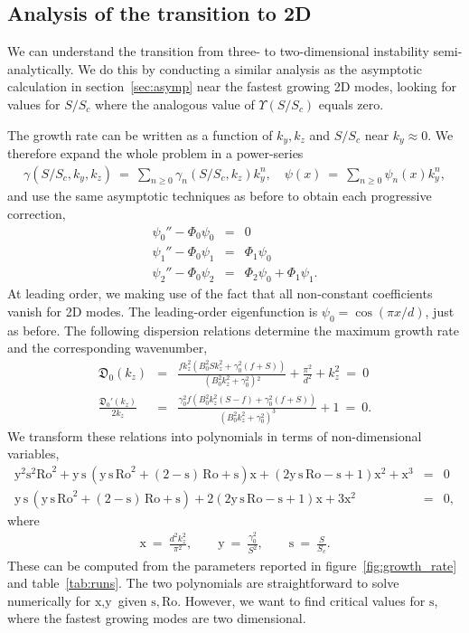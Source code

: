 \documentclass[openacc]{rsproca_new}%
\newcommand{\SSC}{S/S_{c}}
\newcommand\Beq{\begin{eqnarray}}
\newcommand\Eeq{\end{eqnarray}}
\newcommand{\Ro}{\mathrm{Ro}}
\newcommand{\s}{\text{s}}
\newcommand{\x}{\text{x}}
\newcommand{\y}{\text{y}}
\begin{document}
\subsection{Analysis of the transition to 2D}
\label{sec:2D_transition}

We can understand the transition from three- to two-dimensional instability semi-analytically. We do this by conducting a similar analysis as the asymptotic calculation in section~\ref{sec:asymp} near the fastest growing 2D modes, looking for values for $\SSC$ where the analogous value of $\Upsilon(\SSC)$ equals zero. 

The growth rate can be written as a function of  $k_{y},k_{z}$ and $\SSC$ near $k_{y} \approx0$.  We therefore expand the whole problem in a power-series 
\Beq
\gamma(\SSC,k_{y},k_{z}) \ = \   \sum_{n\ge 0} \gamma_{n}(\SSC,k_{z}) k_{y}^{n}, \quad \psi(x) \ = \ \sum_{n\ge 0} \psi_{n}(x) k_{y}^{n},
\Eeq
and use the same asymptotic techniques as before to obtain each progressive correction,
\Beq
\psi_{0}'' - \Phi_{0} \psi_{0} & = & 0 \label{eq:psi0} \\
\psi_{1}'' - \Phi_{0} \psi_{1} & = & \Phi_{1} \psi_{0} \label{eq:psi1} \\
\psi_{2}'' - \Phi_{0} \psi_{2} & = & \Phi_{2} \psi_{0} + \Phi_{1} \psi_{1}.
\label{eq:psi2}  
\Eeq
At leading order, we making use of the fact that all non-constant coefficients vanish for 2D modes. The leading-order eigenfunction is $\psi_{0} = \cos(\pi x / d)$, just as before. The following dispersion relations determine the maximum growth rate and the corresponding wavenumber,
\Beq
\mathfrak{D}_{0}(k_{z}) &=& \frac{f k_z^2 \left(B_0^2 S k_z^2+\gamma _0^2 (f+S)\right)}{\left(B_0^2 k_z^2+\gamma _0^2\right){}^2}+\frac{\pi ^2}{d^2}+k_z^2 \ = \ 0 \\
\frac{\mathfrak{D}_{0}'(k_{z})}{2k_{z}} &=& \frac{\gamma _0^2 f \left(B_0^2 k_{z}^2 (S-f)+\gamma _0^2 (f+S)\right)}{\left(B_0^2 k_{z}^2+\gamma _0^2\right)^3}+1 \ = \ 0.
\Eeq
We transform these relations into polynomials in terms of non-dimensional variables,
\Beq
\label{dispersion}
\y^2 \s^2 \Ro^2 +  \y \, \s  \, ( \y \, \s \, \Ro^2 + (2  - \s)  \, \Ro + \s ) \x + ( 2 \y \,\s \,  \Ro - \s  + 1 ) \x^2 +\x^3 &=& 0 \\ 
\y \, \s  \, (\y \, \s \, \Ro^2 + (2  - \s)  \, \Ro + \s    )  + 2 ( 2 \y \,\s \,  \Ro - \s  + 1 ) \x +3\x^2 &=& 0,
\label{critical-dispersion}
\Eeq
where
\Beq
\x  \ = \ \frac{d^2 k_z^2}{\pi ^2}, \quad  \quad \y \ = \ \frac{\gamma_{0}^{2}}{S^{2}}, \quad \quad \s  \ = \ \frac{S}{S_{c}}.
\Eeq
These can be computed from the parameters reported in figure~\ref{fig:growth_rate} and table~\ref{tab:runs}.
The two polynomials are straightforward to solve numerically for $\x,\y$ given $\s, \Ro$. However, we want to find critical values for $\s$, where the fastest growing modes are two dimensional. 
\end{document}
